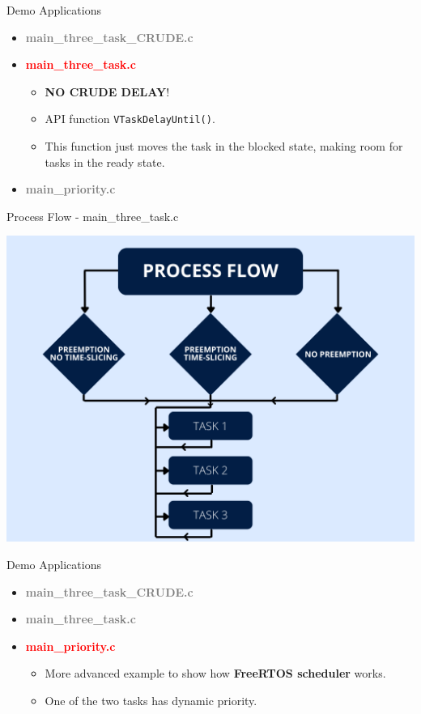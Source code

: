 \documentclass{beamer}
\begin{document}
\begin{frame}{Demo Applications}
    \begin{itemize}
        \item \textcolor{gray}{\textbf{main\_three\_task\_CRUDE.c}}
        \item \textcolor{red}{\textbf{main\_three\_task.c}}
        \begin{itemize}
            \item \textbf{NO CRUDE DELAY}!
            \item API function \texttt{VTaskDelayUntil()}.
            \item This function just moves the task in the blocked state, making room for tasks in the ready state.
        \end{itemize}
        \item \textcolor{gray}{\textbf{main\_priority.c}}
    \end{itemize}
\end{frame}

\begin{frame}{Process Flow - main\_three\_task.c}

\vfill
\centering
\includegraphics[width=0.65\linewidth]{img/three_tasks.png} 
\vfill
    
\end{frame}


\begin{frame}{Demo Applications}
    \begin{itemize}
        \item \textcolor{gray}{\textbf{main\_three\_task\_CRUDE.c}}
        \item \textcolor{gray}{\textbf{main\_three\_task.c}}
        \item \textcolor{red}{\textbf{main\_priority.c}}
        \begin{itemize}
            \item More advanced example to show how \textbf{FreeRTOS scheduler} works.
            \item One of the two tasks has dynamic priority.
        \end{itemize}
    \end{itemize}
\end{frame}
\end{document}
